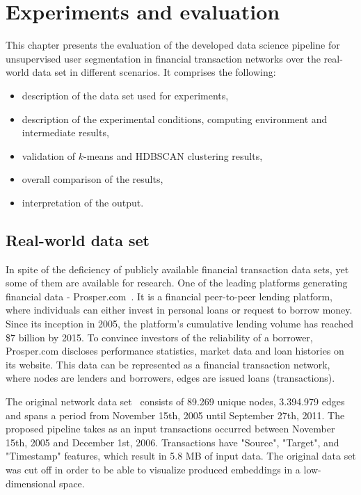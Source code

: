 \chapter{Experiments and evaluation}
\label{cha:evaluation}

This chapter presents the evaluation of the developed data science pipeline for unsupervised user segmentation in financial transaction networks over the real-world data set in different scenarios. It comprises the following:
    \begin{itemize}
        \item description of the data set used for experiments,
        \item description of the experimental conditions, computing environment and intermediate results,
        \item validation of $k$-means and HDBSCAN clustering results,
        \item overall comparison of the results,
        \item interpretation of the output.
    \end{itemize}

\section{Real-world data set}
In spite of the deficiency of publicly available financial transaction data sets, yet some of them are available for research. One of the leading platforms generating financial data - Prosper.com~\cite{Prosper}. It is a financial peer-to-peer lending platform, where individuals can either invest in personal loans or request to borrow money. Since its inception in 2005, the platform's cumulative lending volume has reached \$7 billion by 2015. To convince investors of the reliability of a borrower, Prosper.com discloses performance statistics, market data and loan histories on its website. This data can be represented as a financial transaction network, where nodes are lenders and borrowers, edges are issued loans (transactions).

The original network data set~\cite{konect:2017:prosper-loans} consists of 89.269 unique nodes, 3.394.979 edges and spans a period from November 15th, 2005 until September 27th, 2011. The proposed pipeline takes as an input transactions occurred between November 15th, 2005 and December 1st, 2006. Transactions have "Source", "Target", and "Timestamp" features, which result in 5.8 MB of input data. The original data set was cut off in order to be able to visualize produced embeddings in a low-dimensional space.

